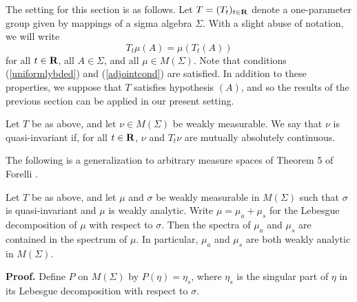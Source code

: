 The setting for this section is as follows. 
Let  
$T=(T_t)_{t\in\R}$ denote a one-parameter group given by 
mappings of a sigma algebra  $\Sigma$.  With a slight abuse of notation,
we will write
$$T_t\mu(A)=\mu(T_t(A))$$
for all $t\in\R$, all $A\in \Sigma$, and all 
$\mu\in M(\Sigma)$.  Note that
conditions (\ref{uniformlybded}) and (\ref{adjointcond}) are satisfied.  
In addition to these properties,
we suppose that $T$ satisfies hypothesis $(A)$, and so the results of the
previous section can be applied in our present setting.
\begin{defqi}
Let $T$ be as above, and let 
$\nu\in M(\Sigma)$ be weakly measurable.  
We say that $\nu$ is quasi-invariant if, 
for all $t\in\R$, $\nu$ 
and $T_t\nu$ are mutually absolutely continuous.
\label{defqi}
\end{defqi}

The following is a generalization to arbitrary measure spaces of 
Theorem 5 of Forelli \cite{forelli}.
\begin{decomposition}
Let $T$ be as above, and
let $\mu$ and $\sigma$ be weakly measurable in $M(\Sigma)$ such that
$\sigma$ is quasi-invariant and $\mu$ is weakly analytic.
Write $\mu=\mu_a+\mu_s$ for the Lebesgue decomposition of 
$\mu$ with respect to $\sigma$.  Then the spectra of 
$\mu_a$ and $\mu_s$ are contained
in the spectrum of $\mu$.  In particular, $\mu_a$ and 
$\mu_s$ are both
weakly analytic in $M(\Sigma)$.
\label{decomposition}
\end{decomposition}
{\bf Proof.}  Define $P$ on $M(\Sigma)$ by
$P(\eta)=\eta_s$, where $\eta_s$
is the singular part of $\eta$ in its Lebesgue 
decomposition with respect to $\sigma$.  

